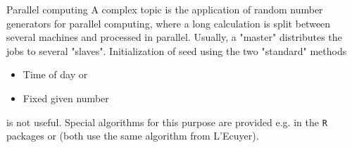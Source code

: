\documentclass[11pt,compress,t,notes=noshow, xcolor=table]{beamer}
\begin{document}
\begin{vbframe}{Parallel computing}
A complex topic is the application of random number generators for parallel computing, where a long calculation is split between several machines and processed in parallel.
Usually, a "master" distributes the jobs to several "slaves".
Initialization of seed using the two "standard" methods
\begin{itemize}
  \item Time of day or
  \item Fixed given number
\end{itemize}
is not useful.
Special algorithms for this purpose are provided e.g. in the \texttt{R} packages  or
 (both use the same algorithm from L'Ecuyer).
\end{vbframe}



\endlecture
\end{document}
